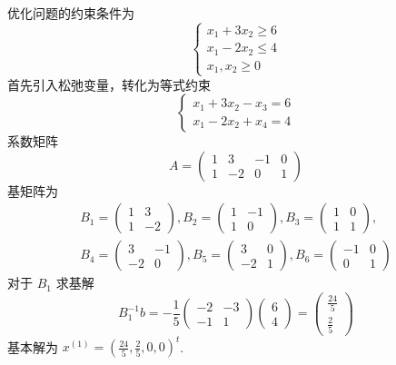 \begin{example}
    优化问题的约束条件为 
    \[
        \begin{cases}
            x_1 + 3x_2 \ge 6\\
            x_1 - 2x_2 \le 4\\
            x_1, x_2 \ge 0
        \end{cases}    
    \]
    首先引入松弛变量，转化为等式约束
    \[
        \begin{cases}
            x_1 + 3x_2 - x_3 = 6\\
            x_1 - 2x_2 + x_4 = 4
        \end{cases}
    \]
    系数矩阵 
    \[A = \begin{pmatrix}
        1 & 3 & -1 & 0\\
        1 & -2 & 0 & 1
    \end{pmatrix}\]
    基矩阵为 
    \begin{gather*}
        B_1 = \begin{pmatrix}
            1 & 3\\
            1 & -2
        \end{pmatrix}, B_2 = \begin{pmatrix}
            1 & -1\\
            1 & 0
        \end{pmatrix}, B_3 = \begin{pmatrix}
            1 & 0\\
            1 & 1
        \end{pmatrix},\\
        B_4 = \begin{pmatrix}
            3 & -1\\
            -2 & 0
        \end{pmatrix}, B_5 = \begin{pmatrix}
            3 & 0\\
            -2 & 1
        \end{pmatrix}, B_6 = \begin{pmatrix}
            -1 & 0\\
            0 & 1
        \end{pmatrix}
    \end{gather*}
    对于 $B_1$ 求基解
    \[
        B_1^{-1}b = -\frac{1}{5}\begin{pmatrix}
            -2 & -3\\
            -1 & 1
        \end{pmatrix}\begin{pmatrix}
            6\\
            4
        \end{pmatrix} = \begin{pmatrix}
            \frac{24}{5}\\
            \frac{2}{5}
        \end{pmatrix}
    \]
    基本解为 $x^{(1)} = \left(\frac{24}{5}, \frac{2}{5}, 0, 0\right)^t$.
    

\end{example}
